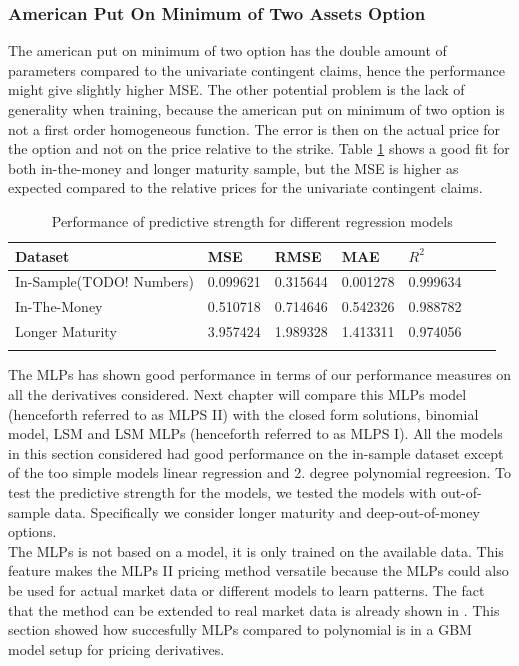 \subsubsection{American Put On Minimum of Two Assets Option}
The american put on minimum of two option has the double amount of parameters compared to the univariate contingent claims, hence the performance might give slightly higher MSE. The other potential problem is the lack of generality when training, because the american put on minimum of two option is not a first order homogeneous function. The error is then on the actual price for the option and not on the price relative to the strike. Table \ref{tab:AmerMinPerformanceComparision} shows a good fit for both in-the-money and longer maturity sample, but the MSE is higher as expected compared to the relative prices for the univariate contingent claims.  

\begin{table}[th]
\caption{Performance of predictive strength for different regression models}
\label{tab:AmerMinPerformanceComparision}
\centering
\begin{tabular}{l l l l l l l }
\toprule
\textbf{Dataset} & \textbf{MSE} & \textbf{RMSE} & \textbf{MAE} & \textbf{$R^2$} \\
\midrule
In-Sample(TODO! Numbers) & 0.099621 & 0.315644 & 0.001278 & 0.999634\\
In-The-Money & 0.510718 & 0.714646 & 0.542326 & 0.988782\\
Longer Maturity & 3.957424 & 1.989328 & 1.413311 & 0.974056\\
\bottomrule\\
\end{tabular}
\end{table}

The MLPs has shown good performance in terms of our performance measures on all the derivatives considered. Next chapter will compare this MLPs model (henceforth referred to as MLPS II) with the closed form solutions, binomial model, LSM and LSM MLPs (henceforth referred to as MLPS I). All the models in this section considered had good performance on the in-sample dataset except of the too simple models linear regression and 2. degree polynomial regreesion. To test the predictive strength for the models, we tested the models with out-of-sample data. Specifically we consider longer maturity and deep-out-of-money options.\\

The MLPs is not based on a model, it is only trained on the available data. This feature makes the MLPs II pricing method versatile because the MLPs could also be used for actual market data or different models to learn patterns. The fact that the method can be extended to real market data is already shown in \parencite{GasparRaquel20}. This section showed how succesfully MLPs compared to polynomial is in a GBM model setup for pricing derivatives.









